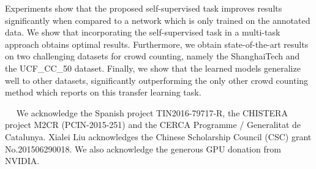 \documentclass[10pt,twocolumn,letterpaper]{article}
\newcommand{\minisection}[1]{\vspace{0.04in} \noindent {\bf #1}\ \ }
\begin{document}
Experiments show that the proposed self-supervised task improves
results significantly when compared to a network which is only trained
on the annotated data. We show that incorporating the self-supervised
task in a multi-task approach obtains optimal results. Furthermore, we
obtain state-of-the-art results on two challenging datasets for crowd
counting, namely the ShanghaiTech and the UCF\_CC\_50
dataset. Finally, we show that the learned models generalize well to
other datasets, significantly outperforming the only other crowd
counting method which reports on this transfer learning task.

\minisection{Acknowledgements}
We acknowledge  the  Spanish project TIN2016-79717-R, the CHISTERA project M2CR (PCIN-2015-251) and the CERCA Programme / Generalitat de Catalunya. Xialei Liu acknowledges the Chinese Scholarship Council (CSC) grant No.201506290018. We also acknowledge the generous GPU donation from NVIDIA.

\newpage
{\small


}
\end{document}
